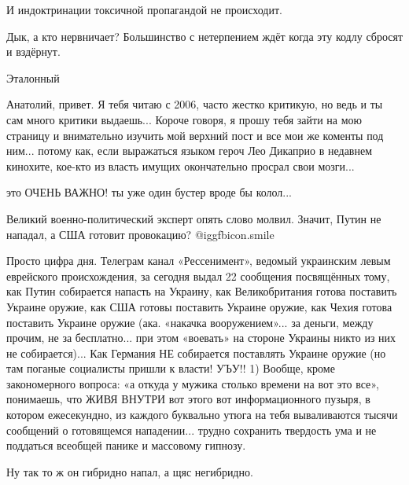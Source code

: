 \begin{itemize}
И индоктринации токсичной пропагандой не происходит.


Дык, а кто нервничает? Большинство с нетерпением ждёт когда эту кодлу сбросят и вздёрнут.

Эталонный


Анатолий, привет. Я тебя читаю с 2006, часто жестко критикую, но ведь и ты сам
много критики выдаешь... Короче говоря, я прошу тебя зайти на мою страницу и
внимательно изучить мой верхний пост и все мои же коменты под ним... потому
как, если выражаться языком героч Лео Дикаприо в недавнем кинохите, кое-кто из
власть имущих окончательно просрал свои мозги...

это ОЧЕНЬ ВАЖНО! ты уже один бустер вроде бы колол...



Великий военно-политический эксперт опять слово молвил. Значит, Путин не
нападал, а США готовит провокацию?  @igg{fbicon.smile} 


Просто цифра дня. Телеграм канал «Рессенимент», ведомый украинским левым
еврейского происхождения, за сегодня выдал 22 сообщения посвящённых тому, как
Путин собирается напасть на Украину, как Великобритания готова поставить
Украине оружие, как США готовы поставить Украине оружие, как Чехия готова
поставить Украине оружие (ака. «накачка вооружением»... за деньги, между прочим,
не за бесплатно... при этом «воевать» на стороне Украины никто из них не
собирается)... Как Германия НЕ собирается поставлять Украине оружие (но там
поганые социалисты пришли к власти! УЪУ!! 1) Вообще, кроме закономерного
вопроса: «а откуда у мужика столько времени на вот это все», понимаешь, что
ЖИВЯ ВНУТРИ вот этого вот информационного пузыря, в котором ежесекундно, из
каждого буквально утюга на тебя вываливаются тысячи сообщений о готовящемся
нападении... трудно сохранить твердость ума и не поддаться всеобщей панике и
массовому гипнозу.


Ну так то ж он гибридно напал, а щяс негибридно.

\end{itemize} %
